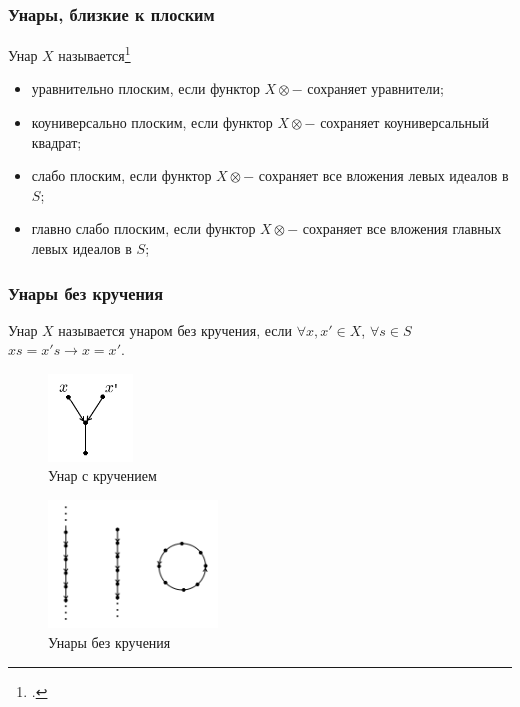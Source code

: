 \documentclass[11pt, notheorems]{beamer}
\begin{document}
\begin{frame}
	\frametitle{Унары, близкие к плоским}
	
	Унар $X$ называется\footcite[определения III.9.1 и III.8.1]{kilp}

	\begin{itemize}
		\item уравнительно плоским, если функтор $X \otimes - $ сохраняет уравнители; \pause
		\item коуниверсально плоским, если функтор $X \otimes - $ сохраняет коуниверсальный квадрат; \pause
		\item слабо плоским, если функтор $X \otimes - $ сохраняет все вложения левых идеалов в $S$; \pause
		\item главно слабо плоским, если функтор $X \otimes - $ сохраняет все вложения главных левых идеалов в $S$;

	\end{itemize}
\end{frame}

\begin{frame}
	\frametitle{Унары без кручения}

	Унар $X$ называется унаром без кручения, если $\forall x, x' \in X$, $\forall s \in S$ $xs = x's \rightarrow x = x'$.

	\pause

	\begin{figure}
		\center
		\includegraphics[width=0.2\textwidth]{torsion_free.png}
		\caption{Унар с кручением}
	\end{figure}

	\pause

	\begin{figure}
		\center
		\includegraphics[width=0.4\textwidth]{flat_unar_1.png}
		\caption{Унары без кручения}
	\end{figure}
\end{frame}
\end{document}

